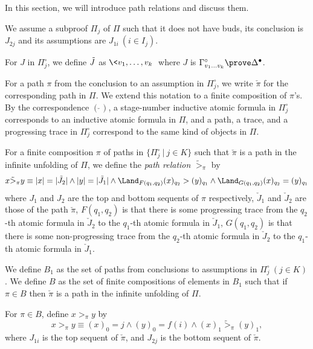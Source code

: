 In this section, we will introduce path relations and discuss them.

We assume a subproof $\Pi_j$ of $\Pi$ 
such that it does not have buds,
its conclusion is $J_{2j}$ and its assumptions are
$J_{1i} \ (i \in I_j)$. 

For $J$ in $\Pi^\circ_j$, we define $\Tilde J$ as $\< v_1,\ldots,v_k \>$ where
$J$ is $\Gamma^\circ_{v_1\ldots v_k} \prove \Delta^\bullet$.

For a path $\pi$ from the conclusion to an assumption in $\Pi_j^\circ$,
we write $\check\pi$ for the corresponding path in $\Pi$.
We extend this notation to a finite composition of $\pi$'s.
By the correspondence $(\check{\ })$,
a stage-number inductive atomic formula in $\Pi^\circ_j$
corresponds to an inductive atomic formula in $\Pi$,
and
a path, a trace, and a progressing trace in $\Pi^\circ_j$
correspond to the same kind of objects in $\Pi$.

\begin{Def}\rm
For a finite composition $\pi$ of paths in $\{ \Pi_j^\circ \ |\ j \in K\}$ such that
$\check\pi$ is a path in the infinite unfolding of $\Pi$,
we define the {\em path relation} $\tilde>_{\pi}$ by
\[
x \tilde>_{\pi} y \equiv
|x|=|\Tilde J_2| \land |y|=|\Tilde J_1| \land
\Land_{F(q_1,q_2)} (x)_{q_2} > (y)_{q_1}
\land
\Land_{G(q_1,q_2)} (x)_{q_2} = (y)_{q_1}
\]
where 
$J_1$ and $J_2$ are the top and bottom sequents of $\pi$ respectively,
$\check J_1$ and $\check J_2$ are those of the path $\check\pi$,
$F(q_1,q_2)$ is that
there is some progressing trace from the $q_2$-th atomic formula in $\check J_2$
to the $q_1$-th atomic formula in $\check J_1$,
$G(q_1,q_2)$ is that
there is some non-progressing trace from the $q_2$-th atomic formula in $\check J_2$ to the $q_1$-th atomic formula in $\check J_1$.
\end{Def}

We define $B_1$ as the set of paths from conclusions to assumptions in 
$\Pi^\circ_j \ (j \in K)$.
We define $B$ as the set of finite compositions of elements in $B_1$ such that
if $\pi \in B$ then $\check\pi$ is a path in the infinite unfolding of $\Pi$.

\begin{Def}\rm\label{def:>}
For $\pi \in B$,
define $x >_{\pi} y$ by
\[
x >_{\pi} y \equiv
(x)_0=j \land (y)_0=f(i) \land  (x)_1 \tilde>_{\pi} (y)_1,
\]
where 
$J_{1i}$ is the top sequent of $\check\pi$, and
$J_{2j}$ is the bottom sequent of $\check\pi$.
\end{Def}

